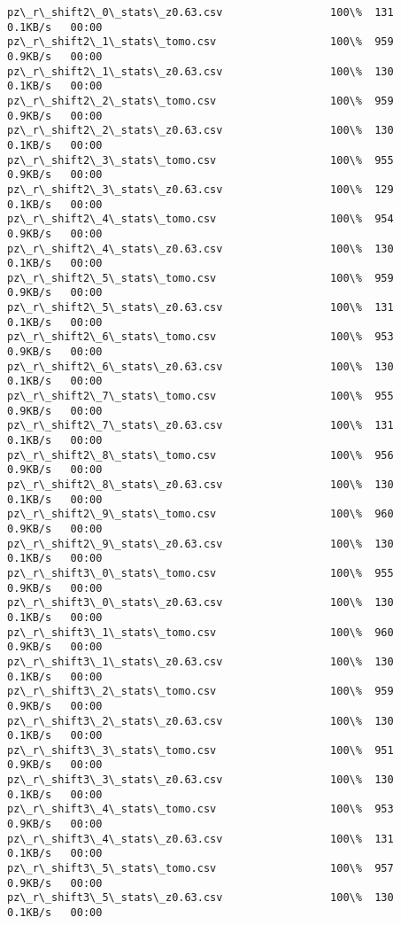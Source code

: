 \documentclass[11pt]{article}
\begin{document}
\begin{Verbatim}[commandchars=\\\{\}]
pz\_r\_shift2\_0\_stats\_z0.63.csv                 100\%  131     0.1KB/s   00:00    
pz\_r\_shift2\_1\_stats\_tomo.csv                  100\%  959     0.9KB/s   00:00    
pz\_r\_shift2\_1\_stats\_z0.63.csv                 100\%  130     0.1KB/s   00:00    
pz\_r\_shift2\_2\_stats\_tomo.csv                  100\%  959     0.9KB/s   00:00    
pz\_r\_shift2\_2\_stats\_z0.63.csv                 100\%  130     0.1KB/s   00:00    
pz\_r\_shift2\_3\_stats\_tomo.csv                  100\%  955     0.9KB/s   00:00    
pz\_r\_shift2\_3\_stats\_z0.63.csv                 100\%  129     0.1KB/s   00:00    
pz\_r\_shift2\_4\_stats\_tomo.csv                  100\%  954     0.9KB/s   00:00    
pz\_r\_shift2\_4\_stats\_z0.63.csv                 100\%  130     0.1KB/s   00:00    
pz\_r\_shift2\_5\_stats\_tomo.csv                  100\%  959     0.9KB/s   00:00    
pz\_r\_shift2\_5\_stats\_z0.63.csv                 100\%  131     0.1KB/s   00:00    
pz\_r\_shift2\_6\_stats\_tomo.csv                  100\%  953     0.9KB/s   00:00    
pz\_r\_shift2\_6\_stats\_z0.63.csv                 100\%  130     0.1KB/s   00:00    
pz\_r\_shift2\_7\_stats\_tomo.csv                  100\%  955     0.9KB/s   00:00    
pz\_r\_shift2\_7\_stats\_z0.63.csv                 100\%  131     0.1KB/s   00:00    
pz\_r\_shift2\_8\_stats\_tomo.csv                  100\%  956     0.9KB/s   00:00    
pz\_r\_shift2\_8\_stats\_z0.63.csv                 100\%  130     0.1KB/s   00:00    
pz\_r\_shift2\_9\_stats\_tomo.csv                  100\%  960     0.9KB/s   00:00    
pz\_r\_shift2\_9\_stats\_z0.63.csv                 100\%  130     0.1KB/s   00:00    
pz\_r\_shift3\_0\_stats\_tomo.csv                  100\%  955     0.9KB/s   00:00    
pz\_r\_shift3\_0\_stats\_z0.63.csv                 100\%  130     0.1KB/s   00:00    
pz\_r\_shift3\_1\_stats\_tomo.csv                  100\%  960     0.9KB/s   00:00    
pz\_r\_shift3\_1\_stats\_z0.63.csv                 100\%  130     0.1KB/s   00:00    
pz\_r\_shift3\_2\_stats\_tomo.csv                  100\%  959     0.9KB/s   00:00    
pz\_r\_shift3\_2\_stats\_z0.63.csv                 100\%  130     0.1KB/s   00:00    
pz\_r\_shift3\_3\_stats\_tomo.csv                  100\%  951     0.9KB/s   00:00    
pz\_r\_shift3\_3\_stats\_z0.63.csv                 100\%  130     0.1KB/s   00:00    
pz\_r\_shift3\_4\_stats\_tomo.csv                  100\%  953     0.9KB/s   00:00    
pz\_r\_shift3\_4\_stats\_z0.63.csv                 100\%  131     0.1KB/s   00:00    
pz\_r\_shift3\_5\_stats\_tomo.csv                  100\%  957     0.9KB/s   00:00    
pz\_r\_shift3\_5\_stats\_z0.63.csv                 100\%  130     0.1KB/s   00:00    

\end{Verbatim}
\end{document}
